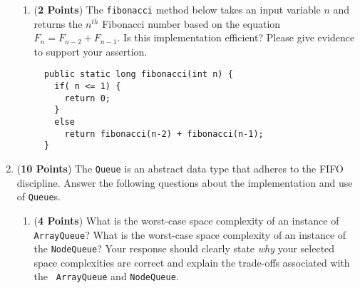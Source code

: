 \documentclass[12pt]{article}
\begin{document}
\begin{enumerate}
\begin{enumerate}
  \item ({\bf 2 Points}) The \texttt{fibonacci} method below takes an input variable $n$ and returns the $n^{th}$
  Fibonacci number based on the equation $F_n = F_{n-2} + F_{n-1}$. Is this implementation efficient?  Please give
  evidence to support your assertion.

{\small \begin{verbatim}
  public static long fibonacci(int n) {
    if( n <= 1) {
      return 0;
    }
    else
      return fibonacci(n-2) + fibonacci(n-1);
  }
\end{verbatim}}


\end{enumerate}

\newpage

\item ({\bf 10 Points}) The {\tt Queue} is an abstract data type that
  adheres to the FIFO discipline.  Answer the following questions
  about the implementation and use of {\tt Queue}s.

  \begin{enumerate}

  \item ({\bf 4 Points}) What is the worst-case space complexity of an
    instance of {\tt ArrayQueue}?  What is the worst-case space
    complexity of an instance of the {\tt NodeQueue}?  Your response
    should clearly state {\em why} your selected space complexities
    are correct and explain the trade-offs associated with the {\tt
      ArrayQueue} and {\tt NodeQueue}.



\end{enumerate}
\end{enumerate}
\end{document}
